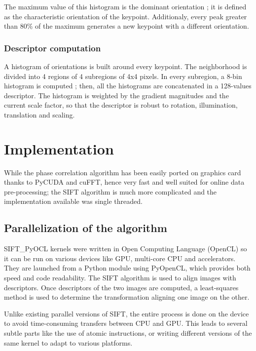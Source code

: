 \documentclass[preprint]{iucr}
\begin{document}
The maximum value of this histogram is the dominant orientation ; it is defined as the characteristic orientation of the keypoint. Additionaly, every peak greater than 80\% of the maximum generates a new keypoint with a different orientation.



\subsubsection{Descriptor computation}
A histogram of orientations is built around every keypoint. The neighborhood is divided into 4 regions of 4 subregions of 4x4 pixels. In every subregion, a 8-bin histogram is computed ; then, all the histograms are concatenated in a 128-values descriptor. The histogram is weighted by the gradient magnitudes and the current scale factor, so that the descriptor is robust to rotation, illumination, translation and scaling.


\section{Implementation}
While the phase correlation algorithm has been easily ported on graphics card
thanks to PyCUDA and cuFFT, hence very fast and well suited for online data
pre-processing;
the SIFT algorithm is much more complicated and the implementation available was
single threaded.


\subsection{Parallelization of the algorithm}
SIFT\_PyOCL kernels were written in Open Computing Language\cite{opencl}
(OpenCL) so it can be run on various devices like GPU, multi-core CPU and
accelerators. 
They are launched from a Python module using PyOpenCL\cite{pyopencl},  which
provides both speed and code readability. 
The SIFT algorithm is used to align images with descriptors. 
Once descriptors of the two images are computed, a least-squares method is used
to determine the transformation aligning one image on the other.

Unlike existing parallel versions of SIFT\cite{lu,rister,vasilyev}, the entire
process is done on the device to avoid time-consuming transfers between CPU and
GPU. 
This leads to several subtle parts like the use of atomic instructions, or writing 
different versions of the same kernel to adapt to various platforms.
\end{document}
